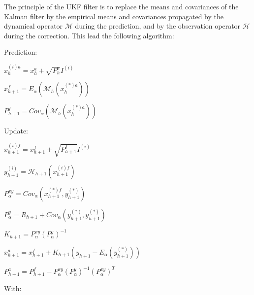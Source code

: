 \documentclass{tufte-book}
\begin{document}
\-The principle of the \-U\-K\-F filter is to replace the means and covariances of the \-Kalman filter by the empirical means and covariances propagated by the dynamical operator $\mathcal{M}$ during the prediction, and by the observation operator $\mathcal{H}$ during the correction. \-This lead the following algorithm\-:
\begin{DoxyEnumerate}
\item \-Prediction\-:
\begin{DoxyItemize}
\item $x_{h}^{(i)a} = x_h^a + \sqrt{P_h^a} I^{(i)} $\par

\item $x_{h+1}^f = E_{\alpha}(\mathcal{M}_{h}(x_h^{(*)a}))$\par

\item $P_{h+1}^f = Cov_{\alpha}(\mathcal{M}_{h}(x_h^{(*)a}))$
\end{DoxyItemize}
\item \-Update\-:
\begin{DoxyItemize}
\item $x_{h+1}^{(i)f} = x_{h+1}^f + \sqrt{P_{h+1}^f} I^{(i)} $\par

\item $y_{h+1}^{(i)} = \mathcal{H}_{h+1}(x_{h+1}^{(i)f})$\par

\item $P_{\alpha}^{xy} = Cov_{\alpha}(x_{h+1}^{(*)f}, y_{h+1}^{(*)})$\par

\item $P_{\alpha}^{y} = R_{h+1} + Cov_{\alpha}(y_{h+1}^{(*)}, y_{h+1}^{(*)})$\par

\item $K_{h+1} = P_{\alpha}^{xy}(P_{\alpha}^{y})^{-1}$ \par

\item $x_{h+1}^a = x_{h+1}^f + K_{h+1}(y_{h+1} - E_{\alpha}(y_{h+1}^{(*)}))$\par

\item $P_{h+1}^a = P_{h+1}^f - P_{\alpha}^{xy}(P_{\alpha}^{y})^{-1}(P_{\alpha}^{xy})^T$
\end{DoxyItemize}


\end{DoxyEnumerate}\-With\-: \par
\end{document}
